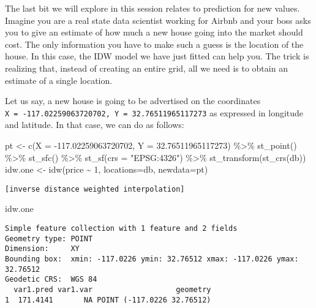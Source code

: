 \documentclass[
  letterpaper,
  krantz2]{style/krantz}
\newenvironment{Shaded}{\begin{snugshade}}{\end{snugshade}}
\newcommand{\AttributeTok}[1]{\textcolor[rgb]{0.40,0.45,0.13}{#1}}
\newcommand{\DecValTok}[1]{\textcolor[rgb]{0.68,0.00,0.00}{#1}}
\newcommand{\FloatTok}[1]{\textcolor[rgb]{0.68,0.00,0.00}{#1}}
\newcommand{\FunctionTok}[1]{\textcolor[rgb]{0.28,0.35,0.67}{#1}}
\newcommand{\NormalTok}[1]{\textcolor[rgb]{0.00,0.23,0.31}{#1}}
\newcommand{\OtherTok}[1]{\textcolor[rgb]{0.00,0.23,0.31}{#1}}
\newcommand{\SpecialCharTok}[1]{\textcolor[rgb]{0.37,0.37,0.37}{#1}}
\newcommand{\StringTok}[1]{\textcolor[rgb]{0.13,0.47,0.30}{#1}}
\begin{document}
The last bit we will explore in this session relates to prediction for
new values. Imagine you are a real state data scientist working for
Airbnb and your boss asks you to give an estimate of how much a new
house going into the market should cost. The only information you have
to make such a guess is the location of the house. In this case, the IDW
model we have just fitted can help you. The trick is realizing that,
instead of creating an entire grid, all we need is to obtain an estimate
of a single location.

Let us say, a new house is going to be advertised on the coordinates
\texttt{X\ =\ -117.02259063720702,\ Y\ =\ 32.76511965117273} as
expressed in longitude and latitude. In that case, we can do as follows:

\begin{Shaded}
\begin{Highlighting}[]
\NormalTok{pt }\OtherTok{\textless{}{-}} \FunctionTok{c}\NormalTok{(}\AttributeTok{X =} \SpecialCharTok{{-}}\FloatTok{117.02259063720702}\NormalTok{, }\AttributeTok{Y =} \FloatTok{32.76511965117273}\NormalTok{) }\SpecialCharTok{\%\textgreater{}\%}
  \FunctionTok{st\_point}\NormalTok{() }\SpecialCharTok{\%\textgreater{}\%}
  \FunctionTok{st\_sfc}\NormalTok{() }\SpecialCharTok{\%\textgreater{}\%}
  \FunctionTok{st\_sf}\NormalTok{(}\AttributeTok{crs =} \StringTok{"EPSG:4326"}\NormalTok{) }\SpecialCharTok{\%\textgreater{}\%}
  \FunctionTok{st\_transform}\NormalTok{(}\FunctionTok{st\_crs}\NormalTok{(db))}
\NormalTok{idw.one }\OtherTok{\textless{}{-}} \FunctionTok{idw}\NormalTok{(price }\SpecialCharTok{\textasciitilde{}} \DecValTok{1}\NormalTok{, }\AttributeTok{locations=}\NormalTok{db, }\AttributeTok{newdata=}\NormalTok{pt)}
\end{Highlighting}
\end{Shaded}

\begin{verbatim}
[inverse distance weighted interpolation]
\end{verbatim}

\begin{Shaded}
\begin{Highlighting}[]
\NormalTok{idw.one}
\end{Highlighting}
\end{Shaded}

\begin{verbatim}
Simple feature collection with 1 feature and 2 fields
Geometry type: POINT
Dimension:     XY
Bounding box:  xmin: -117.0226 ymin: 32.76512 xmax: -117.0226 ymax: 32.76512
Geodetic CRS:  WGS 84
  var1.pred var1.var                   geometry
1  171.4141       NA POINT (-117.0226 32.76512)
\end{verbatim}
\end{document}
